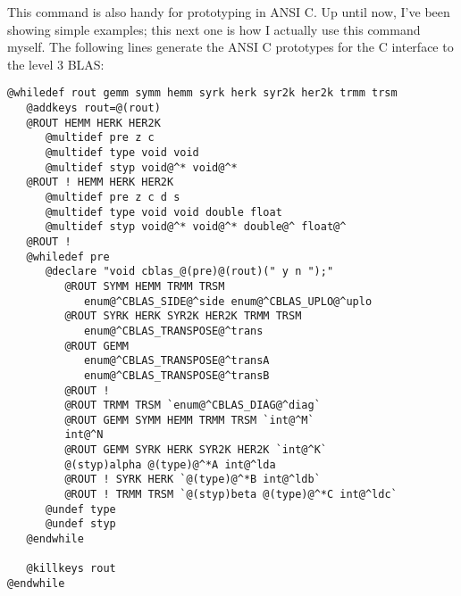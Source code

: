 This command is also handy for prototyping in ANSI C.  Up until now,
I've been showing simple examples;  this next one is how I actually
use this command myself.  The following lines generate the ANSI C
prototypes for the C interface to the level 3 BLAS:

\begin{verbatim}
@whiledef rout gemm symm hemm syrk herk syr2k her2k trmm trsm
   @addkeys rout=@(rout)
   @ROUT HEMM HERK HER2K
      @multidef pre z c
      @multidef type void void
      @multidef styp void@^* void@^*
   @ROUT ! HEMM HERK HER2K
      @multidef pre z c d s
      @multidef type void void double float
      @multidef styp void@^* void@^* double@^ float@^
   @ROUT !
   @whiledef pre
      @declare "void cblas_@(pre)@(rout)(" y n ");"
         @ROUT SYMM HEMM TRMM TRSM 
            enum@^CBLAS_SIDE@^side enum@^CBLAS_UPLO@^uplo
         @ROUT SYRK HERK SYR2K HER2K TRMM TRSM 
            enum@^CBLAS_TRANSPOSE@^trans
         @ROUT GEMM
            enum@^CBLAS_TRANSPOSE@^transA
            enum@^CBLAS_TRANSPOSE@^transB
         @ROUT !
         @ROUT TRMM TRSM `enum@^CBLAS_DIAG@^diag`
         @ROUT GEMM SYMM HEMM TRMM TRSM `int@^M`
         int@^N
         @ROUT GEMM SYRK HERK SYR2K HER2K `int@^K`
         @(styp)alpha @(type)@^*A int@^lda
         @ROUT ! SYRK HERK `@(type)@^*B int@^ldb`
         @ROUT ! TRMM TRSM `@(styp)beta @(type)@^*C int@^ldc`
      @undef type
      @undef styp
   @endwhile

   @killkeys rout
@endwhile
\end{verbatim}

